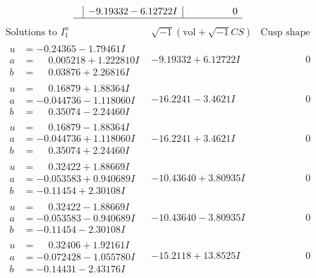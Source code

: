 \documentclass[1p]{elsarticle_modified}
\theoremstyle{definition}
\newcommand{\I}{\sqrt{-1}}
\begin{document}
$$\begin{array}{c|c|c}
 & -9.19332 - 6.12722 I & \phantom{-0.000000 } 0\\
 \hline 
 \end{array}$$\newpage$$\begin{array}{c|c|c}  
\text{Solutions to }I^u_{1}& \I (\text{vol} + \sqrt{-1}CS) & \text{Cusp shape}\\
 \hline 
\begin{aligned}
u &= -0.24365 - 1.79461 I \\
a &= \phantom{-}0.005218 + 1.222810 I \\
b &= \phantom{-}0.03876 + 2.26816 I\end{aligned}
 & -9.19332 + 6.12722 I & \phantom{-0.000000 } 0 \\ \hline\begin{aligned}
u &= \phantom{-}0.16879 + 1.88364 I \\
a &= -0.044736 - 1.118060 I \\
b &= \phantom{-}0.35074 - 2.24460 I\end{aligned}
 & -16.2241 - 3.4621 I & \phantom{-0.000000 } 0 \\ \hline\begin{aligned}
u &= \phantom{-}0.16879 - 1.88364 I \\
a &= -0.044736 + 1.118060 I \\
b &= \phantom{-}0.35074 + 2.24460 I\end{aligned}
 & -16.2241 + 3.4621 I & \phantom{-0.000000 } 0 \\ \hline\begin{aligned}
u &= \phantom{-}0.32422 + 1.88669 I \\
a &= -0.053583 + 0.940689 I \\
b &= -0.11454 + 2.30108 I\end{aligned}
 & -10.43640 + 3.80935 I & \phantom{-0.000000 } 0 \\ \hline\begin{aligned}
u &= \phantom{-}0.32422 - 1.88669 I \\
a &= -0.053583 - 0.940689 I \\
b &= -0.11454 - 2.30108 I\end{aligned}
 & -10.43640 - 3.80935 I & \phantom{-0.000000 } 0 \\ \hline\begin{aligned}
u &= \phantom{-}0.32406 + 1.92161 I \\
a &= -0.072428 - 1.055780 I \\
b &= -0.14431 - 2.43176 I\end{aligned}
 & -15.2118 + 13.8525 I & \phantom{-0.000000 } 0 \\ \hline\begin{aligned}

\end{aligned}
\end{array}$$
\end{document}
